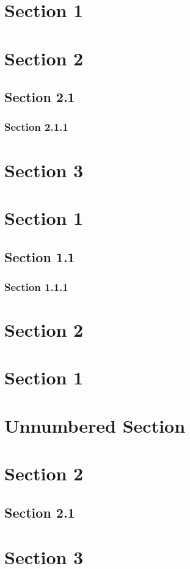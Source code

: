 \hypertarget{x-section-1}{\section*{Section 1}}
\hypertarget{x-section-2}{\section*{Section 2}}
\hypertarget{x-section-2.1}{\subsection*{Section 2.1}}
\hypertarget{x-section-2.1.1}{\subsubsection*{Section 2.1.1}}
\hypertarget{x-section-3}{\section*{Section 3}}

\hypertarget{x-section-1}{\section*{Section 1}}
\hypertarget{x-section-1.1}{\subsection*{Section 1.1}}
\hypertarget{x-section-1.1.1}{\subsubsection*{Section 1.1.1}}
\hypertarget{x-section-2}{\section*{Section 2}}

\hypertarget{x-section-1}{\section{Section 1}}
\hypertarget{x-unnumbered-section}{\section*{Unnumbered Section}}
\hypertarget{x-section-2}{\section{Section 2}}
\hypertarget{x-section-2.1}{\subsection{Section 2.1}}
\hypertarget{x-section-3}{\section{Section 3}}

